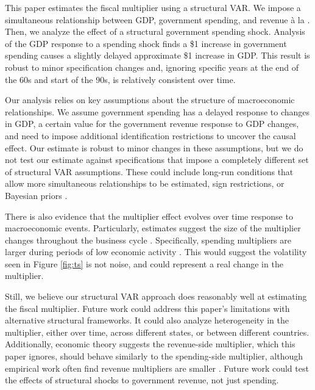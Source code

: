 This paper estimates the fiscal multiplier using a structural VAR. We impose a simultaneous relationship between GDP, government spending, and revenue à la \textcite{blanchard2002empirical}. Then, we analyze the effect of a structural government spending shock. Analysis of the GDP response to a spending shock finds a \$1 increase in government spending causes a slightly delayed approximate \$1 increase in GDP. This result is robust to minor specification changes and, ignoring specific years at the end of the 60s and start of the 90s, is relatively consistent over time.

Our analysis relies on key assumptions about the structure of macroeconomic relationships. We assume government spending has a delayed response to changes in GDP, a certain value for the government revenue response to GDP changes, and need to impose additional identification restrictions to uncover the causal effect. Our estimate is robust to minor changes in these assumptions, but we do not test our estimate against specifications that impose a completely different set of structural VAR assumptions. These could include long-run conditions that allow more simultaneous relationships to be estimated, sign restrictions, or Bayesian priors \parencites{mountford2009effects}{afonso2019fiscal}.

There is also evidence that the multiplier effect evolves over time response to macroeconomic events. Particularly, estimates suggest the size of the multiplier changes throughout the business cycle \parencites{baum2012fiscal}{albonico2021public}. Specifically, spending multipliers are larger during periods of low economic activity \parencite{arin2015fiscal}. This would suggest the volatility seen in Figure \ref{fig:ts} is not noise, and could represent a real change in the multiplier.

Still, we believe our structural VAR approach does reasonably well at estimating the fiscal multiplier. Future work could address this paper's limitations with alternative structural frameworks. It could also analyze heterogeneity in the multiplier, either over time, across different states, or between different countries. Additionally, economic theory suggests the revenue-side multiplier, which this paper ignores, should behave similarly to the spending-side multiplier, although empirical work often find revenue multipliers are smaller \parencite{mineshima2014size}. Future work could test the effects of structural shocks to government revenue, not just spending.
